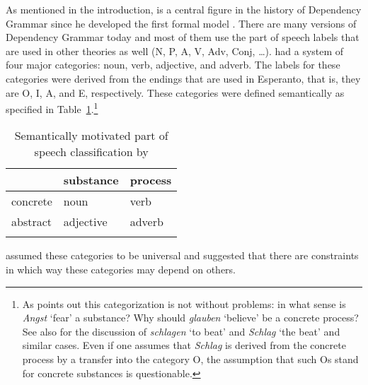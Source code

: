 As mentioned in the introduction, \tes is a central figure in the history of Dependency Grammar
since he developed the first formal model \citep{Tesniere59a-u,Tesniere80a-u,Tesniere2015a-u}. There are many versions
of Dependency Grammar today and most of them use the part of speech labels that are used in other
theories as well (N, P, A, V, Adv, Conj, \ldots). \tes had a system of four major categories: noun,
verb, adjective, and adverb. The labels for these categories were derived from the endings that are
used in Esperanto, that is, they are O, I, A, and E, respectively. These categories
were defined semantically as specified in Table~\ref{table-pos-tesniere}.\footnote{
  As 
\citet[]{Weber97a} points out this categorization is not without problems: in what
  sense is \emph{Angst} `fear' a substance? Why should \emph{glauben} `believe' be a concrete
  process? See also \citet[Section~3.4]{Klein71a-u} for the discussion of \emph{schlagen} `to beat' and
  \emph{Schlag} `the beat' and similar cases. Even if one assumes that \emph{Schlag} is derived from
  the concrete process  by a transfer into the category O, the assumption that such
  Os stand for concrete substances is questionable.
}
\begin{table}
\begin{tabular}{lll}
\lsptoprule
         & substance & process\\
\midrule
concrete & noun & verb \\
abstract & adjective & adverb\\
\lspbottomrule
\end{tabular}
\caption{\label{table-pos-tesniere}Semantically motivated part of speech classification by \tes}
\end{table}%
\tes assumed these categories to be universal and suggested that there are constraints in which way these categories may
depend on others.

